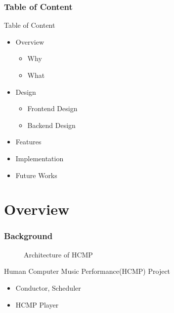 \documentclass[t]{beamer}
\subtitle{Master Thesis Proposal}
\date{\today}
\author[]{Dalong Cheng\textless dalongc@andrew.cmu.edu\textgreater}
\institute{Institution (Not Used)}
\begin{document}
\maketitle

\begin{frame}
\frametitle{Table of Content}

Table of Content
  \begin{itemize}
    \item Overview
      \begin{itemize}
        \item Why  
        \item What 
      \end{itemize}
    \item Design
      \begin{itemize}
        \item Frontend Design 
        \item Backend  Design
      \end{itemize}
    \item Features
    \item Implementation
    \item Future Works 
  \end{itemize}
\end{frame}

\section{Overview}

\begin{frame}
\frametitle{Background}
\begin{figure}[H] %
\caption{Architecture of HCMP}
\label{fig:speciation}
\end{figure}
Human Computer Music Performance(HCMP) Project
  \begin{itemize}
    \item Conductor, Scheduler 
    \item HCMP Player 
  \end{itemize}
\end{frame}
\end{document}
